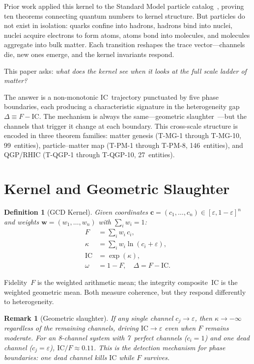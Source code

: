 \documentclass[
  aps,
  prd,
  twocolumn,
  superscriptaddress,
  nofootinbib,
  floatfix
]{revtex4-2}
\newtheorem{definition}[theorem]{Definition}
\newtheorem{remark}{Remark}
\newcommand{\eps}{\varepsilon}
\newcommand{\tvec}{\mathbf{c}}
\newcommand{\wvec}{\mathbf{w}}
\newcommand{\IC}{\mathrm{IC}}
\begin{document}
Prior work applied this kernel to the Standard Model particle
catalog~\cite{pdg2024}, proving ten theorems connecting quantum
numbers to kernel structure.  But particles do not exist in
isolation: quarks confine into hadrons, hadrons bind into nuclei,
nuclei acquire electrons to form atoms, atoms bond into molecules,
and molecules aggregate into bulk matter.  Each transition
reshapes the trace vector---channels die, new ones emerge,
and the kernel invariants respond.

This paper asks: \emph{what does the kernel see when it looks
at the full scale ladder of matter?}

The answer is a non-monotonic $\IC$~trajectory punctuated by
five phase boundaries, each producing a characteristic
signature in the heterogeneity gap $\Delta \equiv F - \IC$.
The mechanism is always the same---geometric
slaughter~\cite{paulus2025umcp}---but the channels that trigger
it change at each boundary.  This cross-scale structure is
encoded in three theorem families: matter genesis (T-MG-1
through T-MG-10, 99~entities), particle--matter map (T-PM-1
through T-PM-8, 146~entities), and QGP/RHIC (T-QGP-1 through
T-QGP-10, 27~entities).

\section{Kernel and Geometric Slaughter}\label{sec:kernel}

\begin{definition}[GCD Kernel]\label{def:kernel}
Given coordinates $\tvec = (c_1, \ldots, c_n) \in [\eps, 1{-}\eps]^n$
and weights $\wvec = (w_1, \ldots, w_n)$ with $\sum_i w_i = 1$:
\begin{align}
  F &= \sum_i w_i \, c_i, \label{eq:F} \\
  \kappa &= \sum_i w_i \ln(c_i + \eps), \label{eq:kappa} \\
  \IC &= \exp(\kappa), \label{eq:IC} \\
  \omega &= 1 - F, \quad
  \Delta = F - \IC. \label{eq:gap}
\end{align}
\end{definition}

Fidelity~$F$ is the weighted arithmetic mean; the integrity
composite~$\IC$ is the weighted geometric mean.  Both measure
coherence, but they respond differently to heterogeneity.

\begin{remark}[Geometric slaughter]
\label{rem:slaughter}
If any single channel $c_j \to \eps$, then
$\kappa \to -\infty$ regardless of the remaining channels,
driving $\IC \to \eps$ even when $F$ remains moderate.
For an 8-channel system with 7~perfect channels ($c_i = 1$)
and one dead channel ($c_j = \eps$), $\IC/F \approx 0.11$.
This is the detection mechanism for phase boundaries:
\emph{one dead channel kills $\IC$ while $F$ survives.}
\end{remark}
\end{document}
